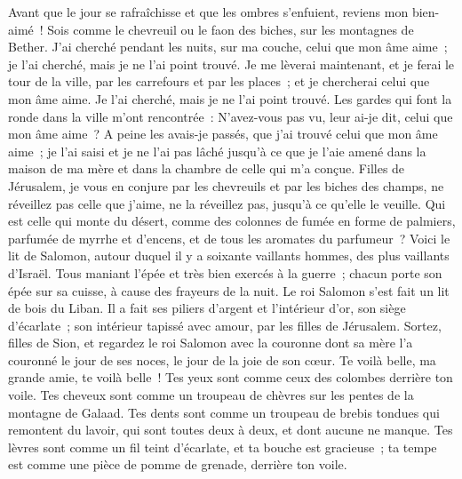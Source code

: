 \begin{multicols}{2}
Avant que le jour se rafraîchisse et que les ombres s'enfuient, reviens mon bien-aimé~! Sois comme le chevreuil ou le faon des biches, sur les montagnes de Bether.
\VerseOne{} J'ai cherché pendant les nuits, sur ma couche, celui que mon âme aime~; je l'ai cherché, mais je ne l'ai point trouvé.
Je me lèverai maintenant, et je ferai le tour de la ville, par les carrefours et par les places~; et je chercherai celui que mon âme aime. Je l'ai cherché, mais je ne l'ai point trouvé.
Les gardes qui font la ronde dans la ville m'ont rencontrée~: N'avez-vous pas vu, leur ai-je dit, celui que mon âme aime~?
A peine les avais-je passés, que j'ai trouvé celui que mon âme aime~; je l'ai saisi et je ne l'ai pas lâché jusqu'à ce que je l'aie amené dans la maison de ma mère et dans la chambre de celle qui m'a conçue.
 Filles de Jérusalem, je vous en conjure par les chevreuils et par les biches des champs, ne réveillez pas celle que j'aime, ne la réveillez pas, jusqu'à ce qu'elle le veuille.
 Qui est celle qui monte du désert, comme des colonnes de fumée en forme de palmiers, parfumée de myrrhe et d'encens, et de tous les aromates du parfumeur~?
 Voici le lit de Salomon, autour duquel il y a soixante vaillants hommes, des plus vaillants d'Israël.
Tous maniant l'épée et très bien exercés à la guerre~; chacun porte son épée sur sa cuisse, à cause des frayeurs de la nuit.
Le roi Salomon s'est fait un lit de bois du Liban.
Il a fait ses piliers d'argent et l'intérieur d'or, son siège d'écarlate~; son intérieur tapissé avec amour, par les filles de Jérusalem.
 Sortez, filles de Sion, et regardez le roi Salomon avec la couronne dont sa mère l'a couronné le jour de ses noces, le jour de la joie de son cœur.
\VerseOne{} Te voilà belle, ma grande amie, te voilà belle~! Tes yeux sont comme ceux des colombes derrière ton voile. Tes cheveux sont comme un troupeau de chèvres sur les pentes de la montagne de Galaad.
Tes dents sont comme un troupeau de brebis tondues qui remontent du lavoir, qui sont toutes deux à deux, et dont aucune ne manque.
Tes lèvres sont comme un fil teint d'écarlate, et ta bouche est gracieuse~; ta tempe est comme une pièce de pomme de grenade, derrière ton voile.

\end{multicols}
